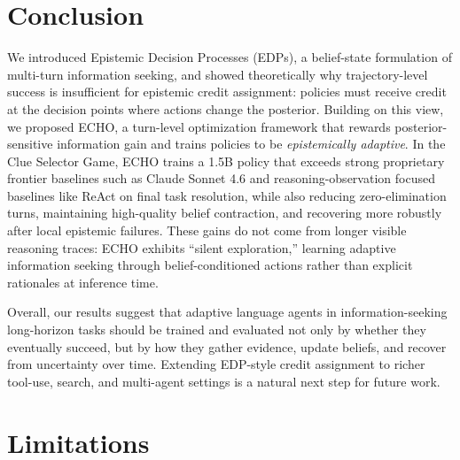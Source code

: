 \documentclass[11pt]{article}
\theoremstyle{plain}
\theoremstyle{definition}
\theoremstyle{remark}
\begin{document}
\section{Conclusion}
\label{sec:conclusion}
\vspace*{-3mm}
We introduced Epistemic Decision Processes (EDPs), a belief-state formulation of multi-turn information seeking, and showed theoretically why trajectory-level success is insufficient for epistemic credit assignment: policies must receive credit at the decision points where actions change the posterior. Building on this view, we proposed \textsc{ECHO}, a turn-level optimization framework that rewards posterior-sensitive information gain and trains policies to be \textit{epistemically adaptive}. In the Clue Selector Game, \textsc{ECHO} trains a 1.5B policy that exceeds strong proprietary frontier baselines such as Claude Sonnet 4.6 and reasoning-observation focused baselines like ReAct on final task resolution, while also reducing zero-elimination turns, maintaining high-quality belief contraction, and recovering more robustly after local epistemic failures. These gains do not come from longer visible reasoning traces: \textsc{ECHO} exhibits ``silent exploration,'' learning adaptive information seeking through belief-conditioned actions rather than explicit rationales at inference time.

Overall, our results suggest that adaptive language agents in information-seeking long-horizon tasks should be trained and evaluated not only by whether they eventually succeed, but by how they gather evidence, update beliefs, and recover from uncertainty over time. Extending EDP-style credit assignment to richer tool-use, search, and multi-agent settings is a natural next step for future work. 

\vspace*{-3mm}
\section*{Limitations}
 
\end{document}
